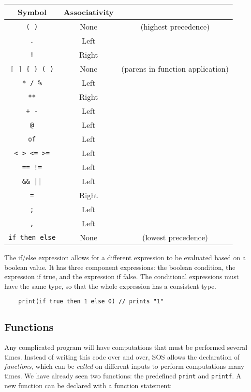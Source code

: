 \documentclass[main.tex]{subfiles}
\begin{document}
	\begin{center}
		\begin{tabular}{|c|cc|}
			\hline
			Symbol & Associativity & \\
			\hline
			\texttt{( )} & None & (highest precedence) \\
			\hline
			\texttt{.} & Left & \\
			\hline
			\texttt{!} & Right & \\
			\hline
			\texttt{[ ] \{ \} ( )} & None & (parens in function application)\\
			\hline
			\texttt{* / \%} & Left &  \\
			\hline
			\texttt{**} & Right & \\
			\hline
			\texttt{+ -} & Left & \\
			\hline
			\texttt{@} & Left &  \\
			\hline
			\texttt{of} & Left & \\
			\hline
			\texttt{< > <= >=} & Left &  \\
			\hline
			\texttt{== !=} & Left &  \\
			\hline
			\texttt{\&\& ||} & Left &  \\
			\hline
			\texttt{=} & Right &  \\
			\hline
			\texttt{;} & Left &  \\
			\hline
			\texttt{,} & Left &  \\
			\hline
			\texttt{if then else} & None & (lowest precedence) \\
			\hline
		\end{tabular}
	\end{center}

	The if/else expression allows for a different expression to be evaluated based on a boolean value. It has three component expressions: the boolean condition, the expression if true, and the expression if false. The conditional expressions must have the same type, so that the whole expression has a consistent type.
	
	\begin{lstlisting}
	print(if true then 1 else 0) // prints "1" \end{lstlisting}
	
	\subsection{Functions}
	Any complicated program will have computations that must be performed several times. Instead of writing this code over and over, SOS allows the declaration of \textit{functions}, which can be \textit{called} on different inputs to perform computations many times. We have already seen two functions: the predefined \texttt{print} and \texttt{printf}. A new function can be declared with a function statement:
	
\end{document}
